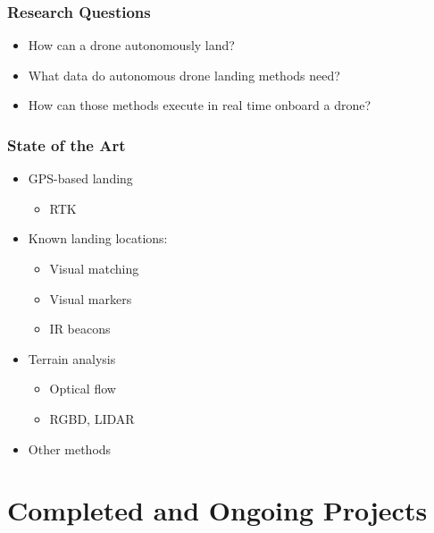 \documentclass[aspectratio=169]{rubeamer}
\newif\ifpause
\newcommand{\mypause}{\ifpause \pause \fi}
\begin{document}
\begin{frame}
  \frametitle{Research Questions}
  \begin{itemize}
    \mypause
    \item How can a drone autonomously land?
    \mypause
    \item What data do autonomous drone landing methods need?
    \mypause
    \item How can those methods execute in real time onboard a drone?
  \end{itemize}
\end{frame}

\begin{frame}
  \frametitle{State of the Art}
  \begin{itemize}
    \item GPS-based landing
    \mypause
    \begin{itemize}
      \item RTK
    \end{itemize}
    \mypause
    \item Known landing locations:
    \begin{itemize}
      \item Visual matching
      \mypause
      \item Visual markers
      \mypause
      \item IR beacons
    \end{itemize}
    \mypause
    \item Terrain analysis
    \begin{itemize}
      \item Optical flow
      \mypause
      \item RGBD, LIDAR
    \end{itemize}
    \mypause
    \item Other methods
  \end{itemize}

\end{frame}

\section{Completed and Ongoing Projects}
\end{document}
